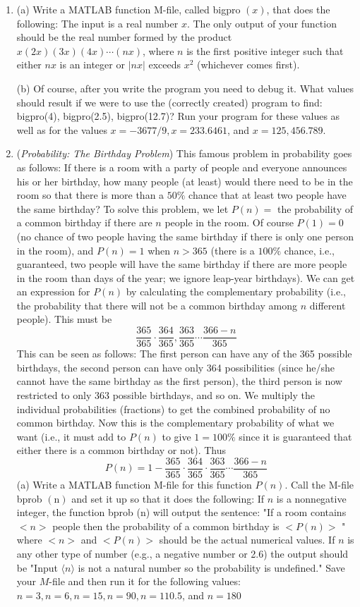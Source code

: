 \documentclass[../main.tex]{subfiles}
\begin{document}
\begin{enumerate}
\item (a) Write a MATLAB function M-file, called bigpro $(x)$, that does the following: The input is a real number $x$. The only output of your function should be the real number formed by the product $x(2 x)(3 x)(4 x) \cdots(n x)$, where $n$ is the first positive integer such that either $n x$ is an integer or $|n x|$ exceeds $x^{2}$ (whichever comes first).

(b) Of course, after you write the program you need to debug it. What values should result if we were to use the (correctly created) program to find: bigpro(4), bigpro(2.5), bigpro(12.7)? Run your program for these values as well as for the values $x=-3677 / 9, x=233.6461$, and $x=125,456.789$.

\item(\emph{Probability: The Birthday Problem}) This famous problem in probability goes as follows: If there is a room with a party of people and everyone announces his or her birthday, how many people (at least) would there need to be in the room so that there is more than a $50 \%$ chance that at least two people have the same birthday?
To solve this problem, we let $P(n)=$ the probability of a common birthday if there are $n$ people in the room. Of course $P(1)=0$ (no chance of two people having the same birthday if there is only one person in the room), and $P(n)=1$ when $n>365$ (there is a $100 \%$ chance, i.e., guaranteed, two people will have the same birthday if there are more people in the room than days of the year; we ignore leap-year birthdays). We can get an expression for $P(n)$ by calculating the complementary probability (i.e., the probability that there will not be a common birthday among $n$ different people). This must be
$$
\frac{365}{365} \cdot \frac{364}{365}, \frac{363}{365} \cdots \frac{366-n}{365}
$$
This can be seen as follows: The first person can have any of the 365 possible birthdays, the second person can have only 364 possibilities (since he/she cannot have the same birthday as the first person), the third person is now restricted to only 363 possible birthdays, and so on. We multiply the individual probabilities (fractions) to get the combined probability of no common birthday. Now this is the complementary probability of what we want (i.e., it must add to $P(n)$ to give $1=100 \%$ since it is guaranteed that either there is a common birthday or not). Thus
$$
P(n)=1-\frac{365}{365} \cdot \frac{364}{365} \cdot \frac{363}{365} \cdots \frac{366-n}{365}
$$
(a) Write a MATLAB function M-file for this function $P(n)$. Call the M-file bprob $(\mathrm{n})$ and set it up so that it does the following: If $n$ is a nonnegative integer, the function bprob (n) will output the sentence: "If a room contains $<n>$ people then the probability of a common birthday is $<P(n)>$ " where $<n>$ and $<P(n)>$ should be the actual numerical values. If $n$ is any other type of number (e.g., a negative number or 2.6) the output should be "Input $\langle n\rangle$ is not a natural number so the probability is undefined." Save your $M$-file and then run it for the following values: $n=3, n=6, n=15, n=90, n=110.5$, and $n=180$


\end{enumerate}
\end{document}
